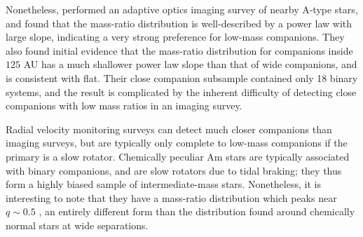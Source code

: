 \documentclass{utthesis}
\begin{document}
Nonetheless, \citet{DeRosa2014} performed an adaptive optics imaging survey of nearby A-type stars, and found that the mass-ratio distribution is well-described by a power law with large slope, indicating a very strong preference for low-mass companions. They also found initial evidence that the mass-ratio distribution for companions inside $125$ AU has a much shallower power law slope than that of wide companions, and is consistent with flat. Their close companion subsample contained only 18 binary systems, and the result is complicated by the inherent difficulty of detecting close companions with low mass ratios in an imaging survey. 

Radial velocity monitoring surveys can detect much closer companions than imaging surveys, but are typically only complete to low-mass companions if the primary is a slow rotator. Chemically peculiar Am stars are typically associated with binary companions, and are slow rotators due to tidal braking; they thus form a highly biased sample of intermediate-mass stars. Nonetheless, it is interesting to note that they have a mass-ratio distribution which peaks near $q \sim 0.5$ \citep{Vuissoz2004}, an entirely different form than the distribution found around chemically normal stars at wide separations.





















\end{document}
